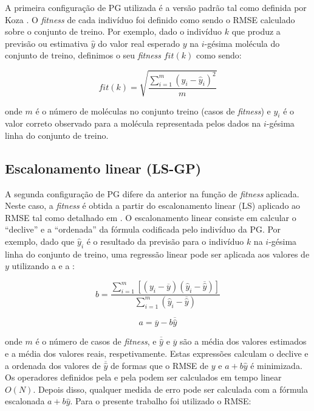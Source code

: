 A primeira configuração de \ac{PG} utilizada é a versão padrão tal como definida por Koza \citep{Koza1992}. O \emph{fitness} de cada indivíduo 
foi definido como sendo o \ac{RMSE} calculado sobre o conjunto de treino. Por exemplo, dado o indivíduo $k$ que produz a previsão ou estimativa
$\hat{y}$ do valor real esperado $y$ na $i$-gésima molécula do conjunto de treino, definimos o seu \emph{fitness} $fit(k)$ como sendo:

\begin{equation}
fit(k) = \sqrt{\frac{\sum_{i=1}^{m} (y_i-\hat{y}_i)^2}{m}}
\label{Equacao531}
\end{equation}

\noindent onde $m$ é o número de moléculas no conjunto treino (casos de \emph{fitness}) e $y_i$ é o valor correto observado para a molécula 
representada pelos dados na $i$-gésima linha do conjunto de treino.


\subsection{Escalonamento linear (LS-GP)}
\label{LSGP}

A segunda configuração de \ac{PG} difere da anterior na função de \emph{fitness} aplicada. Neste caso, a \emph{fitness} é obtida 
a partir do escalonamento linear (\ac{LS}) aplicado ao \ac{RMSE} tal como detalhado em \citep{keijzer03}. O escalonamento linear consiste em calcular o 
``declive'' e a ``ordenada'' da fórmula codificada pelo indivíduo da \ac{PG}. Por exemplo, dado que $\hat{y}_i$ é o resultado da previsão para 
o indivíduo $k$ na $i$-gésima linha do conjunto de treino, uma regressão linear pode ser aplicada aos valores de $y$ utilizando a
 e a :


\begin{equation}
b = \frac{\sum_{i=1}^{m} [(y_i-\overline{y})(\hat{y}_i-\overline{\hat{y}})]}{\sum_{i=1}^{m} (\hat{y}_i-\overline{\hat{y}})}
\label{Equacao532}
\end{equation}


\begin{equation}
a = \overline{y} - b\overline{\hat{y}}
\label{Equacao533}
\end{equation}

\noindent onde $m$ é o número de casos de \emph{fitness}, e $\overline{\hat{y}}$ e $\overline{y}$ são a média dos valores estimados
e a média dos valores reais, respetivamente. Estas expressões calculam o declive e a ordenada dos valores de $\overline{\hat{y}}$ 
de formas que o \ac{RMSE} de $y$ e $a+b\hat{y}$ é minimizada. Os operadores definidos pela  e pela
 podem ser calculados em tempo linear $O(N)$. Depois disso, qualquer medida de erro pode ser calculada com a fórmula
escalonada $a + b\hat{y}$. Para o presente trabalho foi utilizado o \ac{RMSE}:


